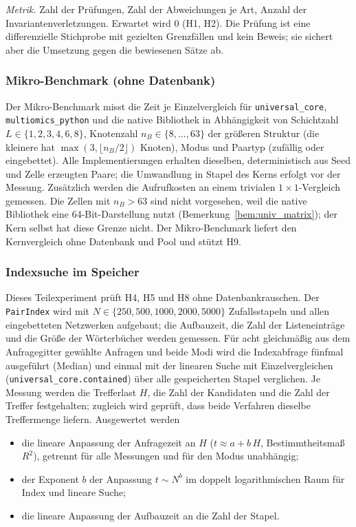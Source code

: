 \emph{Metrik.} Zahl der Prüfungen, Zahl der Abweichungen je Art, Anzahl der Invariantenverletzungen. Erwartet wird $0$ (H1, H2). Die Prüfung ist eine differenzielle Stichprobe mit gezielten Grenzfällen und kein Beweis; sie sichert aber die Umsetzung gegen die bewiesenen Sätze ab.

\subsubsection{Mikro-Benchmark (ohne Datenbank)}
\label{sec:ucx_micro}

Der Mikro-Benchmark misst die Zeit je Einzelvergleich für \texttt{universal\_core}, \texttt{multiomics\_python} und die native Bibliothek in Abhängigkeit von Schichtzahl $L\in\{1,2,3,4,6,8\}$, Knotenzahl $n_B\in\{8,\dots,63\}$ der größeren Struktur (die kleinere hat $\max(3,\lfloor n_B/2\rfloor)$ Knoten), Modus und Paartyp (zufällig oder eingebettet). Alle Implementierungen erhalten dieselben, deterministisch aus Seed und Zelle erzeugten Paare; die Umwandlung in Stapel des Kerns erfolgt vor der Messung. Zusätzlich werden die Aufrufkosten an einem trivialen $1\times1$-Vergleich gemessen. Die Zellen mit $n_B>63$ sind nicht vorgesehen, weil die native Bibliothek eine 64-Bit-Darstellung nutzt (Bemerkung~\ref{bem:univ_matrix}); der Kern selbst hat diese Grenze nicht. Der Mikro-Benchmark liefert den Kernvergleich ohne Datenbank und Pool und stützt H9.

\subsubsection{Indexsuche im Speicher}
\label{sec:ucx_memory}

Dieses Teilexperiment prüft H4, H5 und H8 ohne Datenbankrauschen. Der \texttt{PairIndex} wird mit $N\in\{250,500,1000,2000,5000\}$ Zufallsstapeln und allen eingebetteten Netzwerken aufgebaut; die Aufbauzeit, die Zahl der Listeneinträge und die Größe der Wörterbücher werden gemessen. Für acht gleichmäßig aus dem Anfragegitter gewählte Anfragen und beide Modi wird die Indexabfrage fünfmal ausgeführt (Median) und einmal mit der linearen Suche mit Einzelvergleichen (\texttt{universal\_core.contained}) über alle gespeicherten Stapel verglichen. Je Messung werden die Trefferlast $H$, die Zahl der Kandidaten und die Zahl der Treffer festgehalten; zugleich wird geprüft, dass beide Verfahren dieselbe Treffermenge liefern. Ausgewertet werden
\begin{itemize}
	\item die lineare Anpassung der Anfragezeit an $H$ ($t\approx a+b\,H$, Bestimmtheitsmaß $R^2$), getrennt für alle Messungen und für den Modus unabhängig;
	\item der Exponent $b$ der Anpassung $t\sim N^b$ im doppelt logarithmischen Raum für Index und lineare Suche;
	\item die lineare Anpassung der Aufbauzeit an die Zahl der Stapel.
\end{itemize}


